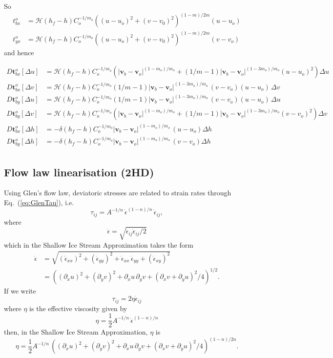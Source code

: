 \documentclass[10pt,a4paper]{book}
\newcommand{\He}{\mathcal{H}}
\newcommand{\p}{\partial}
\newcommand{\eps}{\dot{\epsilon}}
\newcommand{\eij}{\dot{\epsilon}_{ij}}
\newcommand{\exx}{\dot{\epsilon}_{xx}}
\newcommand{\eyy}{\dot{\epsilon}_{yy}}
\newcommand{\exy}{\dot{\epsilon}_{xy}}
\begin{document}
So
\begin{align*}
t_{bx}^o&= \He(h_f-h) C_o^{-1/m_o}  \left ( (u-u_o)^2+(v-v_0)^2 \right )^{(1-m)/2m}  (u-u_o) \\
t_{yx}^o&= \He(h_f-h) C_o^{-1/m_o}  \left ( (u-u_o)^2+(v-v_0)^2 \right )^{(1-m)/2m}  (v-v_o)
\end{align*}
and hence

\begin{align*} 
  D \bm{t}_{bx}^o [\Delta u] &= \He(h_f-h) C_o^{-1/m_o}  \left ( | \bm{v}_b-\bm{v}_o|^{(1-m_o)/m_o}  + (1/m-1)  | \bm{v}_b-\bm{v}_o|^{(1-3m_o)/m_o}  (u-u_o)^2 \right )\Delta u\\
  D \bm{t}_{bx}^o [\Delta v] &= \He(h_f-h) C_o^{-1/m_o}   (1/m-1)  | \bm{v}_b-\bm{v}_o|^{(1-3m_o)/m_o}  \,(v-v_o) (u-u_o) \,\Delta v\\
  D \bm{t}_{by}^o [\Delta u] &= \He(h_f-h) C_o^{-1/m_o}  (1/m-1)  | \bm{v}_b-\bm{v}_o|^{(1-3m_o)/m_o}  \,(v-v_o) (u-u_o) \, \Delta u\\
  D \bm{t}_{by}^o [\Delta v] &= \He(h_f-h) C_o^{-1/m_o}  \left ( | \bm{v}_b-\bm{v}_o|^{(1-m_o)/m_o}  + (1/m-1)  | \bm{v}_b-\bm{v}_o|^{(1-3m_o)/m_o}  (v-v_o)^2 \right )\Delta v\\
  D \bm{t}_{bx}^o [\Delta h] &= -\delta(h_f-h) C_o^{-1/m_o}  | \bm{v}_b-\bm{v}_o|^{(1-m_o)/m_o} \, (u-u_o) \Delta h\\
  D \bm{t}_{by}^o [\Delta h] &= -\delta(h_f-h) C_o^{-1/m_o}  | \bm{v}_b-\bm{v}_o|^{(1-m_o)/m_o} \, (v-v_o) \Delta h\\
\end{align*}

\subsection{Flow law linearisation (2HD)}



Using Glen's flow law, deviatoric stresses are related to strain rates through Eq.~(\ref{eq:GlenTau}), i.e. 
\[
\tau_{ij}=A^{-1/n} \,\dot{\epsilon}^{(1-n)/n}\, \dot{\epsilon}_{ij},
\]
where
\[ 
\dot{\epsilon}=\sqrt{ \eij \eij /2}
\]
which in the Shallow Ice Stream Approximation takes the form
\begin{align}
\eps& =\sqrt{ (\exx)^2 + (\eyy)^2 + \exx \,\eyy + (\exy)^2} \\
    & = ((\p_{x} u)^2 + (\p_{y} v)^2 + \p_{x} u \,\p_{y} v + (\p_{x} v + \p_{y} u)^2/4)^{1/2}.
\end{align}
If we write
\[
\tau_{ij}= 2 \eta \eij
\]
where $\eta$ is the effective viscosity given by
\[
\eta=\frac{1}{2} A^{-1/n} \,\dot{\epsilon}^{(1-n)/n} 
\]
then, in the Shallow Ice Stream Approximation, $\eta$ is
\[ 
\eta= \frac{1}{2} A^{-1/n} \, ((\p_{x} u)^2 + (\p_{y} v)^2 + \p_{x} u \,\p_{y} v + (\p_{x} v + \p_{y} u)^2/4)^{(1-n)/2n}.
\]
\end{document}
